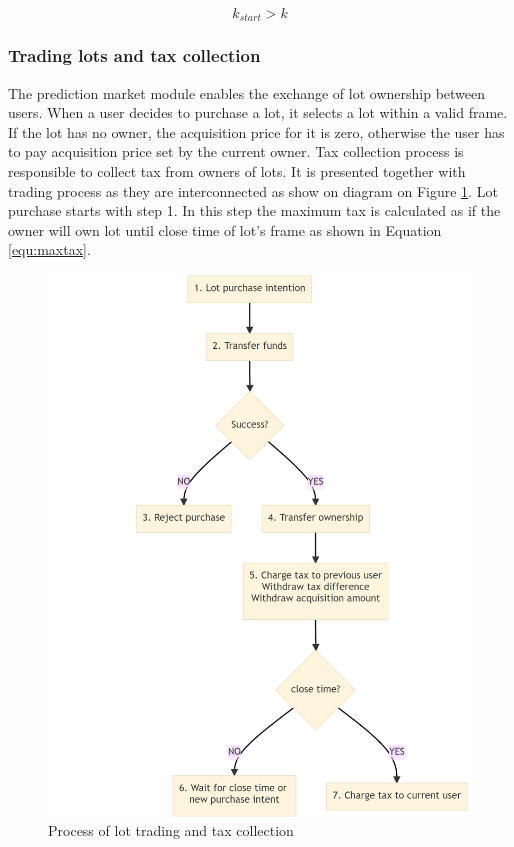 \documentclass{article}
\begin{document}
	\begin{equation}
		k_{start}>k
		\label{equ:frameValid}
	\end{equation}
	
	\subsubsection{Trading lots and tax collection}
	
	The prediction market module enables the exchange of lot ownership between users. When a user decides to purchase a lot, it selects a lot within a valid frame. If the lot has no owner, the acquisition price for it is zero, otherwise the user has to pay acquisition price set by the current owner. Tax collection process is responsible to collect tax from owners of lots. It is presented together with trading process as they are interconnected as show on diagram on Figure  \ref{fig:processLotTrading}. Lot purchase starts with step 1. In this step the maximum tax is calculated as if the owner will own lot until close time of lot's frame as shown in Equation \ref{equ:maxtax}.
	
	\begin{figure}[h]
		\centering
		\includegraphics[scale=0.45]{images/processLotTrading.png}
		\caption{Process of lot trading and tax collection}
		\label{fig:processLotTrading}
	\end{figure}
	
\end{document}
